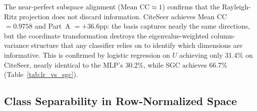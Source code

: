 \documentclass[11pt]{article}
\begin{document}
The near-perfect subspace alignment ($\text{Mean CC} \approx 1$) confirms that the
Rayleigh-Ritz projection does not discard information.  CiteSeer achieves Mean CC $=
0.9758$ and Part~A $= +36.6$pp: the basis captures nearly the same directions, but the
coordinate transformation destroys the eigenvalue-weighted column-variance structure
that any classifier relies on to identify which dimensions are informative.  This is
confirmed by logistic regression on $U$ achieving only 31.4\% on CiteSeer, nearly
identical to the MLP's 30.2\%, while SGC achieves 66.7\% (Table~\ref{tab:lr_vs_sgc}).

\subsection{Class Separability in Row-Normalized Space}
\end{document}
